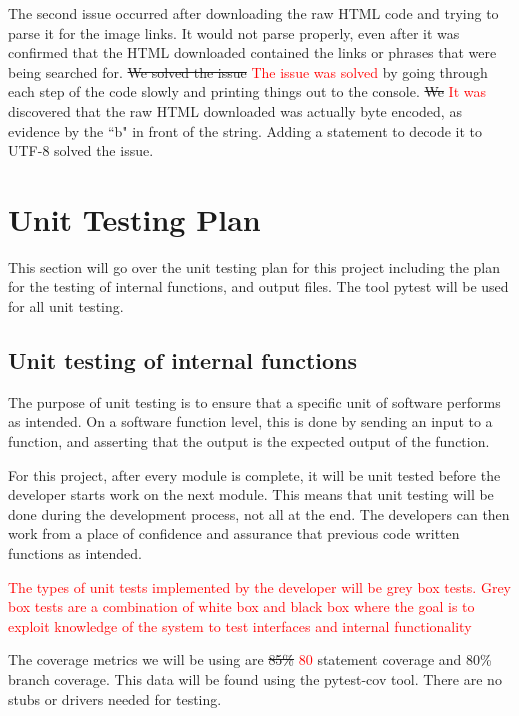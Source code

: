\documentclass[12pt, titlepage]{article}
\begin{document}
The second issue occurred after downloading the raw HTML code and trying to parse it for the image links. 
It would not parse properly, even after it was confirmed that the HTML downloaded contained the links or phrases 
that were being searched for. \sout{We solved the issue} \textcolor{red}{The issue was solved} by going through 
each step of the code slowly and printing things out to the console. \sout{We} \textcolor{red}{It was} discovered that 
the raw HTML downloaded was actually byte encoded, as evidence by the ``b" in front of the string. 
Adding a statement to decode it to UTF-8 solved the issue.
	
\section{Unit Testing Plan}
\label{Unit Testing Plan}

This section will go over the unit testing plan for this project including the plan for the testing of internal functions, and output files. The tool pytest will be used for all unit testing.
		
\subsection{Unit testing of internal functions}

The purpose of unit testing is to ensure that a specific unit of software performs as intended. On a software function level, this is done by sending an input to a function, and asserting that the output is the expected output of the function.

For this project, after every module is complete, it will be unit tested before the developer starts work on the next module. This means that unit testing will be done during the development process, not all at the end. The developers can then work from a place of confidence and assurance that previous code written functions as intended.

\textcolor{red}{The types of unit tests implemented by the developer will be grey box tests. Grey box tests are a
combination of white box and black box where the goal is to exploit knowledge of the system to test interfaces and 
internal functionality}

The coverage metrics we will be using are \sout{85\%} \textcolor{red}{80} statement coverage and 
80\% branch coverage. This data will be found using the pytest-cov tool. There are no stubs 
or drivers needed for testing.
		
\end{document}
